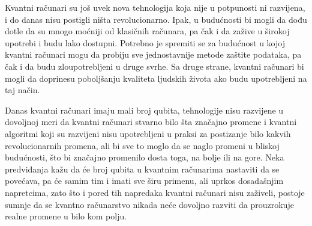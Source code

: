 \documentclass[fleqn, 12pt]{article}
\begin{document}
\begin{text}
Kvantni računari su još uvek nova tehnologija koja nije u potpunosti ni razvijena, i do danas nisu postigli ništa revolucionarno. Ipak, u budućnosti bi mogli da dođu dotle da su mnogo moćniji od klasičnih računara, pa čak i da zažive u širokoj upotrebi i budu lako dostupni. Potrebno je spremiti se za budućnost u kojoj kvantni računari mogu da probiju sve jednostavnije metode zaštite podataka, pa čak i da budu zloupotrebljeni u druge svrhe. Sa druge strane, kvantni računari bi mogli da doprinesu poboljšanju kvaliteta ljudskih života ako budu upotrebljeni na taj način. 

Danas kvantni računari imaju mali broj qubita, tehnologije nisu razvijene u dovoljnoj meri da kvantni računari stvarno bilo šta značajno promene i kvantni algoritmi koji su razvijeni nisu upotrebljeni u praksi za postizanje bilo kakvih revolucionarnih promena, ali bi sve to moglo da se naglo promeni u bliskoj budućnosti, što bi značajno promenilo dosta toga, na bolje ili na gore. Neka predviđanja kažu da će broj qubita u kvantnim računarima nastaviti da se povećava, pa će samim tim i imati sve širu primenu, ali uprkos dosadašnjim napretcima, zato što i pored tih napredaka kvantni računari nisu zaživeli, postoje sumnje da se kvantno računarstvo nikada neće dovoljno razviti da prouzrokuje realne promene u bilo kom polju.
\end{text}
\end{document}
